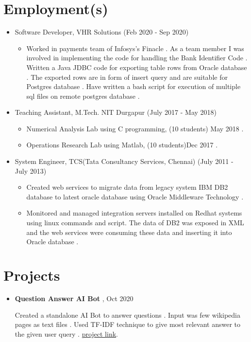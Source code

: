 \documentclass[a4paper,10pt]{article}
\begin{document}
	\section{Employment(s)}
	\begin{itemize}
	        \item Software Developer, VHR Solutions (Feb 2020 - Sep 2020)
                \begin{itemize}
                    \item Worked in payments team of Infosys’s Finacle . As a team member I was involved in implementing the code for handling the Bank Identifier Code . Written a Java JDBC code for exporting table rows from Oracle database . The exported rows are in form of insert query and are suitable for Postgres database . Have written a bash script for execution of multiple sql files on remote postgres database .
                \end{itemize}
			\item Teaching Assistant, M.Tech. NIT Durgapur (July 2017 - May 2018)
                \begin{itemize}
                    \item Numerical Analysis Lab using C programming, (10 students) May 2018 .
                    \item Operations Research Lab using Matlab, (10 students)Dec 2017 .
                \end{itemize}
            \item System Engineer, TCS(Tata Consultancy Services, Chennai) (July 2011 - July 2013)
		        \begin{itemize}
					\item Created web services to migrate data from legacy system IBM DB2 database to latest oracle database using Oracle Middleware Technology .
					\item Monitored and managed integration servers installed on Redhat systems using linux commands and script.
					The data  of DB2 was exposed in XML  and the web services were consuming these data and inserting it into Oracle database .
			\end{itemize}
	\end{itemize}

	\section{Projects}
	
	\begin{itemize}
		\item \textbf{Question Answer AI Bot} , Oct 2020 
		
		Created a standalone AI Bot to answer questions . Input was few wikipedia pages as text files . Used TF-IDF technique to give most relevant answer to the given user query .
		\href{https://github.com/eelectron/questions}{project link}.  
	\end{itemize}
	
\end{document}
